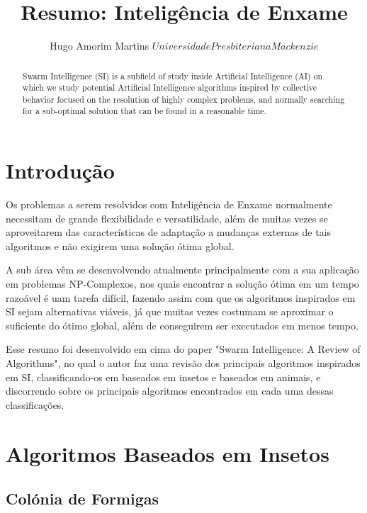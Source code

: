 \documentclass[letterpaper, 10 pt, conference]{ieeeconf}  %
\title{\LARGE \bf
Resumo: Inteligência de Enxame
}
\author{Hugo Amorim Martins ${Universidade Presbiteriana Mackenzie}$}
\begin{document}
\maketitle
\thispagestyle{empty}
\pagestyle{empty}


\begin{abstract}

Swarm Intelligence (SI) is a subfield of study inside Artificial Intelligence (AI) on which we study potential Artificial Intelligence algorithms inspired by collective behavior focused on the resolution of highly complex problems, and normally searching for a sub-optimal solution that can be found in a reasonable time.

\end{abstract}


\section{Introdução}
Os problemas a serem resolvidos com Inteligência de Enxame normalmente necessitam de grande flexibilidade e versatilidade, além de muitas vezes se aproveitarem das características de adaptação a mudanças externas de tais algoritmos e não exigirem uma solução ótima global.

A sub área vêm se desenvolvendo atualmente principalmente com a sua aplicação em problemas NP-Complexos, nos quais encontrar a solução ótima em um tempo razoável é uam tarefa difícil, fazendo assim com que os algoritmos inspirados em SI sejam alternativas viáveis, já que muitas vezes costumam se aproximar o suficiente do ótimo global, além de conseguirem ser executados em menos tempo.

Esse resumo foi desenvolvido em cima do paper "Swarm Intelligence: A Review of Algorithms", no qual o autor faz uma revisão dos principais algoritmos inspirados em SI, classificando-os em baseados em insetos e baseados em animais, e discorrendo sobre os principais algoritmos encontrados em cada uma dessas classificações.

\section{Algoritmos Baseados em Insetos}

\subsection{Colónia de Formigas}
\end{document}
